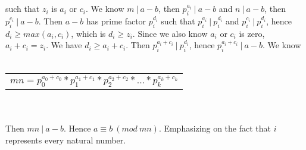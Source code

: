 \documentclass[12pt]{article}
\begin{document}
\\ \\
such that $z_i$ is $a_i$ or $c_i$.
We know $m\ |\ a-b$, then $p_i^{a_i}\ |\ a-b$ and $n\ |\ a-b$, then $p_i^{c_i}\ |\ a-b$. 
Then $a-b$ has prime factor $p_i^{d_i}$ such that $p_i^{a_i}\ |\ p_i^{d_i}$ and $p_i^{c_i}\ |\ p_i^{d_i}$, 
hence $d_i \geq max(a_i,c_i)$, which is
$d_i \geq z_i$. Since we also know $a_i$ or $c_i$ is zero, $a_i+c_i=z_i$. We have
$d_i \geq a_i + c_i$. Then $p_i^{a_i + c_i}\ |\ p_i^{d_i}$, hence $p_i^{a_i + c_i}\ |\ a-b$. We know
\\ \\
\begin{tabular}{l}
    $mn=p_0^{a_0 + c_0}*p_1^{a_1 + c_1}*p_2^{a_2 + c_2}*...*p_k^{a_k + c_k}$ \\
\end{tabular}
\\ \\
Then $mn\ |\ a-b$. Hence $a\equiv b\ (mod\ mn)$. Emphasizing on the fact that $i$ represents every natural number.
\\ \\
\end{document}
